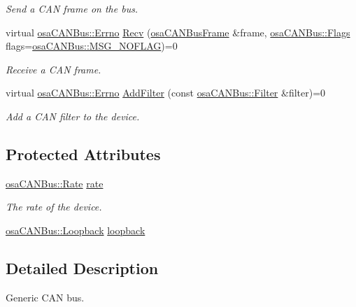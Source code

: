 \begin{DoxyCompactItemize}
\begin{DoxyCompactList}\small\item\em Send a C\-A\-N frame on the bus. \end{DoxyCompactList}\item 
virtual \hyperlink{classosa_c_a_n_bus_a6fa3e95ec4c36932d0640e40e0748fde}{osa\-C\-A\-N\-Bus\-::\-Errno} \hyperlink{classosa_c_a_n_bus_a8c095ec60f161eaf8f014b039f62faab}{Recv} (\hyperlink{classosa_c_a_n_bus_frame}{osa\-C\-A\-N\-Bus\-Frame} \&frame, \hyperlink{classosa_c_a_n_bus_a74fe35c6059237887431f3ccece7b21b}{osa\-C\-A\-N\-Bus\-::\-Flags} flags=\hyperlink{classosa_c_a_n_bus_a74fe35c6059237887431f3ccece7b21ba30f701fa6e0dba6e274540941ccd3978}{osa\-C\-A\-N\-Bus\-::\-M\-S\-G\-\_\-\-N\-O\-F\-L\-A\-G})=0
\begin{DoxyCompactList}\small\item\em Receive a C\-A\-N frame. \end{DoxyCompactList}\item 
virtual \hyperlink{classosa_c_a_n_bus_a6fa3e95ec4c36932d0640e40e0748fde}{osa\-C\-A\-N\-Bus\-::\-Errno} \hyperlink{classosa_c_a_n_bus_abc63dc1654ae14c4e0705c01cd3a6405}{Add\-Filter} (const \hyperlink{classosa_c_a_n_bus_1_1_filter}{osa\-C\-A\-N\-Bus\-::\-Filter} \&filter)=0
\begin{DoxyCompactList}\small\item\em Add a C\-A\-N filter to the device. \end{DoxyCompactList}\end{DoxyCompactItemize}
\subsection*{Protected Attributes}
\begin{DoxyCompactItemize}
\item 
\hyperlink{classosa_c_a_n_bus_ae977dbc0e1c16772395408c8e018fe6c}{osa\-C\-A\-N\-Bus\-::\-Rate} \hyperlink{classosa_c_a_n_bus_a4ff86a9ecf19161b1f34666888e0a331}{rate}
\begin{DoxyCompactList}\small\item\em The rate of the device. \end{DoxyCompactList}\item 
\hyperlink{classosa_c_a_n_bus_a992406c83a336e95fb4a09b0b13df786}{osa\-C\-A\-N\-Bus\-::\-Loopback} \hyperlink{classosa_c_a_n_bus_a724e9c478dd48908882e29f189d98968}{loopback}
\end{DoxyCompactItemize}


\subsection{Detailed Description}
Generic C\-A\-N bus. 


